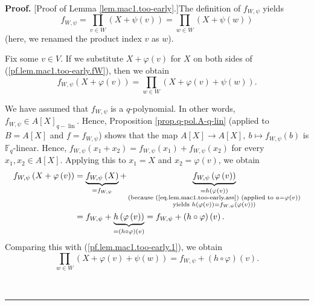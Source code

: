 \documentclass[numbers=enddot,12pt,final,onecolumn,notitlepage]{scrartcl}%
\theoremstyle{definition}
\newenvironment{proof}[1][Proof]{\noindent\textbf{#1.} }{\ \rule{0.5em}{0.5em}}
\let\prodnonlimits\prod
\renewcommand{\prod}{\prodnonlimits\limits}
\begin{document}
\begin{proof}
[Proof of Lemma \ref{lem.mac1.too-early}.]The definition of $f_{W,\psi}$
yields%
\begin{equation}
f_{W,\psi}=\prod_{v\in W}\left(  X+\psi\left(  v\right)  \right)  =\prod_{w\in
W}\left(  X+\psi\left(  w\right)  \right)  \label{pf.lem.mac1.too-early.fW}%
\end{equation}
(here, we renamed the product index $v$ as $w$).

Fix some $v\in V$. If we substitute $X+\varphi\left(  v\right)  $ for $X$ on
both sides of (\ref{pf.lem.mac1.too-early.fW}), then we obtain%
\begin{equation}
f_{W,\psi}\left(  X+\varphi\left(  v\right)  \right)  =\prod_{w\in W}\left(
X+\varphi\left(  v\right)  +\psi\left(  w\right)  \right)  .
\label{pf.lem.mac1.too-early.1}%
\end{equation}


We have assumed that $f_{W,\psi}$ is a $q$-polynomial. In other words,
$f_{W,\psi}\in A\left[  X\right]  _{q-\operatorname*{lin}}$. Hence,
Proposition \ref{prop.q-pol.A-q-lin} (applied to $B=A\left[  X\right]  $ and
$f=f_{W,\psi}$) shows that the map $A\left[  X\right]  \rightarrow A\left[
X\right]  ,\ b\mapsto f_{W,\psi}\left(  b\right)  $ is $\mathbb{F}_{q}%
$-linear. Hence, $f_{W,\psi}\left(  x_{1}+x_{2}\right)  =f_{W,\psi}\left(
x_{1}\right)  +f_{W,\psi}\left(  x_{2}\right)  $ for every $x_{1},x_{2}\in
A\left[  X\right]  $. Applying this to $x_{1}=X$ and $x_{2}=\varphi\left(
v\right)  $, we obtain
\begin{align*}
f_{W,\psi}\left(  X+\varphi\left(  v\right)  \right)   &
=\underbrace{f_{W,\psi}\left(  X\right)  }_{=f_{W,\psi}}+\underbrace{f_{W,\psi
}\left(  \varphi\left(  v\right)  \right)  }_{\substack{=h\left(
\varphi\left(  v\right)  \right)  \\\text{(because
(\ref{eq.lem.mac1.too-early.ass}) (applied to }a=\varphi\left(  v\right)
\text{)}\\\text{yields }h\left(  \varphi\left(  v\right)  \right)  =f_{W,\psi
}\left(  \varphi\left(  v\right)  \right)  \text{)}}}\\
&  =f_{W,\psi}+\underbrace{h\left(  \varphi\left(  v\right)  \right)
}_{=\left(  h\circ\varphi\right)  \left(  v\right)  }=f_{W,\psi}+\left(
h\circ\varphi\right)  \left(  v\right)  .
\end{align*}
Comparing this with (\ref{pf.lem.mac1.too-early.1}), we obtain%
\begin{equation}
\prod_{w\in W}\left(  X+\varphi\left(  v\right)  +\psi\left(  w\right)
\right)  =f_{W,\psi}+\left(  h\circ\varphi\right)  \left(  v\right)  .
\label{pf.lem.mac1.too-early.4}%
\end{equation}



\end{proof}
\end{document}
